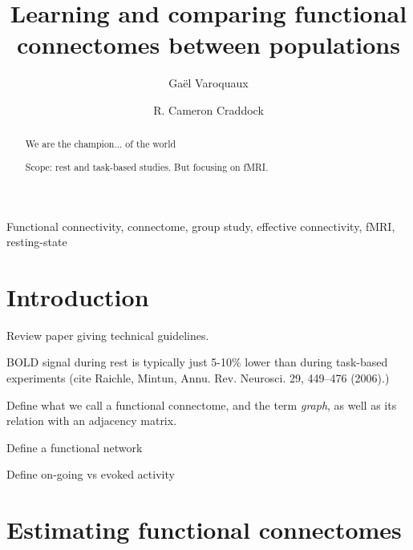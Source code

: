 \documentclass[5p]{elsarticle}
\begin{document}
\title{Learning and comparing functional connectomes between populations}


\author[parietal,unicog,cea]{Ga\"el Varoquaux}
\author[cmi,nki]{R. Cameron Craddock}


\address[parietal]{Parietal project-team, INRIA Saclay-\^ile de France}
\address[unicog]{INSERM, U992}
\address[cea]{CEA/Neurospin b\^at 145, 91191 Gif-Sur-Yvette}
\address[cmi]{Child Mind Institute, New York, New York}
\address[nki]{Nathan Kline Institute for Psychiatric Research, Orangeburg, New York}

\begin{abstract}
    We are the champion... of the world

    Scope: rest and task-based studies. But focusing on fMRI.
\end{abstract}

\begin{keyword}
    Functional connectivity, connectome, group study, effective
    connectivity, fMRI, resting-state
\end{keyword}

\maketitle

\sloppy %
\section{Introduction}

Review paper giving technical guidelines.

BOLD signal during rest is typically just 5-10\% lower than during task-based
experiments (cite Raichle,  Mintun, Annu. Rev. Neurosci. 29, 449–476 (2006).)

Define what we call a functional connectome, and the term \emph{graph},
as well as its relation with an adjacency matrix.

Define a functional network

Define on-going vs evoked activity



\section{Estimating functional connectomes}
\end{document}
